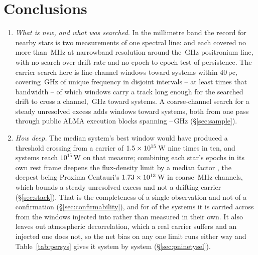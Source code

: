 \section{Conclusions}
\label{sec:conclusions}

\begin{enumerate}[leftmargin=1.6em,itemsep=4pt,topsep=4pt,parsep=0pt]

\item \emph{What is new, and what was searched.} In the millimetre band the
record for nearby stars is two measurements of one spectral line:
\citet{Steffes1994} and \citet{Mauersberger1996} each covered no more than
\SbPriorBandMHz\,MHz at narrowband resolution around the
\SbPriorFreqGHz\,GHz positronium line, with no search over drift rate and no
epoch-to-epoch test of persistence. The carrier search here is \NWinA{}
fine-channel windows toward \NSysClassA{} systems within 40\,pc, covering
\CvUnionA\,GHz of unique frequency in \CovNIslands{} disjoint intervals --
at least \SbPriorRatio{} times that bandwidth -- of which \EdrNWinA{} windows
carry a track long enough for the searched drift to cross a channel,
\EdrUnionGHz\,GHz toward \EdrNSys{} systems. A coarse-channel search for a
steady unresolved excess adds \NWinB{} windows toward \PrSysClassB{} systems,
both from one pass through \NEB{} public ALMA execution blocks spanning
\SurvFreqLo--\SurvFreqHi\,GHz (\S\ref{sec:sample}).

\item \emph{How deep.} The median system's best window would have produced a
threshold crossing from a carrier of $1.5\times10^{15}$\,W nine times in
ten, and \NSysEfifteen{} systems reach $10^{15}$\,W on that measure;
combining each star's epochs in its own rest frame deepens the flux-density
limit by a median factor \SyStkGainMed, the deepest being Proxima Centauri's
$1.73\times10^{13}$\,W in coarse \ChanBModeMHz\,MHz channels, which bounds a
steady unresolved excess and not a drifting carrier (\S\ref{sec:stack}).
That is the completeness of a single observation and not of a confirmation
(\S\ref{sec:confirmability}), and for \SmcNEstSys{} of the \NSysClassA{}
systems it is carried across from the windows injected into rather than
measured in their own. It also leaves out atmospheric decorrelation, which a
real carrier suffers and an injected one does not, so the net bias on any one
limit runs either way and Table~\ref{tab:persys} gives it system by system
(\S\ref{sec:pninetysel}).


\end{enumerate}

